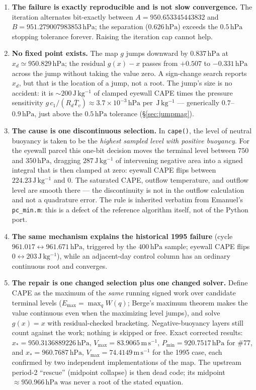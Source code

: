 \documentclass[11pt,a4paper]{article}
\theoremstyle{definition}
\newcommand{\Emax}{E_{\mathrm{max}}}
\newcommand{\hPa}{\,\mathrm{hPa}}
\newcommand{\Jkg}{\,\mathrm{J\,kg^{-1}}}
\newcommand{\ms}{\,\mathrm{m\,s^{-1}}}
\begin{document}
\begin{enumerate}
\item \textbf{The failure is exactly reproducible and is not slow
convergence.}  The iteration alternates bit-exactly between
$A=950.653345443832$ and $B=951.279007983853\hPa$; the separation
($0.626\hPa$) exceeds the $0.5\hPa$ stopping tolerance forever.  Raising the
iteration cap cannot help.
\item \textbf{No fixed point exists.}  The map $g$ jumps downward by
$0.837\hPa$ at $x_d\simeq950.829\hPa$; the residual $g(x)-x$ passes
from $+0.507$ to $-0.331\hPa$ across the jump without taking the value zero.
A sign-change search reports $x_d$, but that is the location of a jump, not
a root.  The jump's size is no accident: it is $\sim\!200\Jkg$ of clamped
eyewall CAPE times the pressure sensitivity
$g\,c_1/(R_d\overline T_v)\approx3.7\times10^{-3}\hPa$ per $\Jkg$ ---
generically $0.7$--$0.9\hPa$, just above the $0.5\hPa$ tolerance
(\S\ref{sec:jumpmag}).
\item \textbf{The cause is one discontinuous selection.}  In \texttt{cape()},
the level of neutral buoyancy is taken to be the \emph{highest sampled level
with positive buoyancy}.  For the eyewall parcel this one-bit decision moves
the terminal level between $750$ and $350\hPa$, dragging $287\Jkg$ of
intervening negative area into a signed integral that is then clamped at
zero: eyewall CAPE flips between $224.23\Jkg$ and $0$.  The saturated CAPE,
outflow temperature, and outflow level are smooth there --- the discontinuity
is not in the outflow calculation and not a quadrature error.  The rule is
inherited verbatim from Emanuel's \texttt{pc\_min.m}: this is a defect of
the reference algorithm itself, not of the Python port.
\item \textbf{The same mechanism explains the historical 1995 failure}
(cycle $961.017\leftrightarrow961.671\hPa$, triggered by the $400\hPa$
sample; eyewall CAPE flips $0\leftrightarrow203\Jkg$), while an adjacent-day
control column has an ordinary continuous root and converges.
\item \textbf{The repair is one changed selection plus one changed solver.}
Define CAPE as the maximum of the \emph{same} running signed work over
candidate terminal levels ($\Emax=\max_qW(q)$; Berge's maximum theorem makes
the value continuous even when the maximizing level jumps), and solve
$g(x)=x$ with residual-checked bracketing.  Negative-buoyancy layers still
count against the work; nothing is skipped or free.  Exact corrected results:
$x_*=950.3136889226\hPa$, $V_{\max}=83.9065\ms$, $P_{\min}=920.7517\hPa$ for
\#77, and $x_*=960.7687\hPa$, $V_{\max}=74.4149\ms$ for the 1995 case, each
confirmed by two independent implementations of the map.  The upstream
period-2 ``rescue''
(midpoint collapse) is then dead code; its midpoint $\approx950.966\hPa$ was
never a root of the stated equation.
\end{enumerate}
\end{document}
